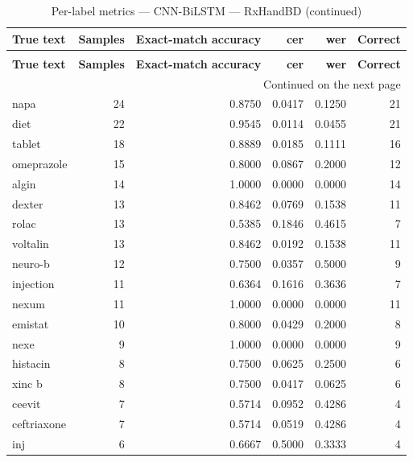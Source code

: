 \begingroup
\setlength{\tabcolsep}{2.5pt}
\renewcommand{\arraystretch}{1.05}
\sloppy
\scriptsize
\begin{longtable}{p{3.0cm}rrrrr}
\caption{Per-label metrics — CNN-BiLSTM — RxHandBD}\label{tab:e2-02_e2cnn_bilstm_evaluation-per-label}\\
\toprule
\textbf{True text} & \textbf{Samples} & \textbf{Exact-match accuracy} & \textbf{cer} & \textbf{wer} & \textbf{Correct} \\
\midrule
\endfirsthead
\caption*{Per-label metrics — CNN-BiLSTM — RxHandBD (continued)}\\
\toprule
\textbf{True text} & \textbf{Samples} & \textbf{Exact-match accuracy} & \textbf{cer} & \textbf{wer} & \textbf{Correct} \\
\midrule
\endhead
\midrule
\multicolumn{6}{r}{Continued on the next page}\\
\endfoot
\bottomrule
\endlastfoot
napa & 24 & 0.8750 & 0.0417 & 0.1250 & 21 \\
diet & 22 & 0.9545 & 0.0114 & 0.0455 & 21 \\
tablet & 18 & 0.8889 & 0.0185 & 0.1111 & 16 \\
omeprazole & 15 & 0.8000 & 0.0867 & 0.2000 & 12 \\
algin & 14 & 1.0000 & 0.0000 & 0.0000 & 14 \\
dexter & 13 & 0.8462 & 0.0769 & 0.1538 & 11 \\
rolac & 13 & 0.5385 & 0.1846 & 0.4615 & 7 \\
voltalin & 13 & 0.8462 & 0.0192 & 0.1538 & 11 \\
neuro-b & 12 & 0.7500 & 0.0357 & 0.5000 & 9 \\
injection & 11 & 0.6364 & 0.1616 & 0.3636 & 7 \\
nexum & 11 & 1.0000 & 0.0000 & 0.0000 & 11 \\
emistat & 10 & 0.8000 & 0.0429 & 0.2000 & 8 \\
nexe & 9 & 1.0000 & 0.0000 & 0.0000 & 9 \\
histacin & 8 & 0.7500 & 0.0625 & 0.2500 & 6 \\
xinc b & 8 & 0.7500 & 0.0417 & 0.0625 & 6 \\
ceevit & 7 & 0.5714 & 0.0952 & 0.4286 & 4 \\
ceftriaxone & 7 & 0.5714 & 0.0519 & 0.4286 & 4 \\
inj & 6 & 0.6667 & 0.5000 & 0.3333 & 4 \\

\end{longtable}
